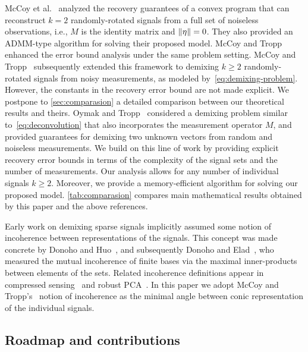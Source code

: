McCoy et al.~\cite{mccoy2014convexity} analyzed the recovery guarantees of a convex program that can reconstruct $k = 2$ randomly-rotated signals from a full set of noiseless observations, i.e., $M$ is the identity matrix and $\|\eta\|=0$. They also provided an ADMM-type algorithm for solving their proposed model. McCoy and Tropp~\cite{mccoy2014sharp} enhanced the error bound analysis under the same problem setting. McCoy and Tropp~\cite{mccoy2013achievable} subsequently extended this framework to demixing $k \geq 2$ randomly-rotated signals from noisy measurements, as modeled by~\eqref{eq:demixing-problem}. However, the constants in the recovery error bound are not made explicit. We postpone to \autoref{sec:comparasion} a detailed comparison between our theoretical results and theirs. Oymak and Tropp~\cite{oymak2017universality} considered a demixing problem similar to~\eqref{eq:deconvolution} that also incorporates the measurement operator $M$, and provided guarantees for demixing two unknown vectors from random and noiseless measurements. We build on this line of work by providing explicit recovery error bounds in terms of the complexity of the signal sets and the number of measurements. Our analysis allows for any number of individual signals $k\ge2$. Moreover, we provide a memory-efficient algorithm for solving our proposed model. \autoref{tab:comparasion} compares main mathematical results obtained by this paper and the above references.

Early work on demixing sparse signals implicitly assumed some notion of incoherence between representations of the signals. This concept was made concrete by Donoho and Huo~\cite{doh01}, and subsequently Donoho and Elad~\cite{doe03}, who measured the mutual incoherence of finite bases via the maximal inner-products between elements of the sets. Related incoherence definitions appear in compressed sensing~\cite{tro04, maleki2009coherence} and robust PCA~\cite{candes2011robust, wright2013compressive}. In this paper we adopt McCoy and Tropp's~\cite{mccoy2013achievable} notion of incoherence as the minimal angle between conic representation of the individual signals.

\subsection{Roadmap and contributions}

